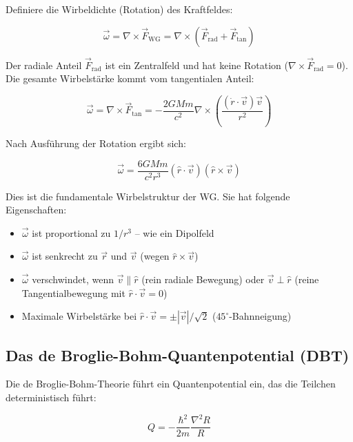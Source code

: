\documentclass[12pt,a4paper]{article}
\begin{document}
Definiere die Wirbeldichte (Rotation) des Kraftfeldes:

\begin{equation}
\vec{\omega} = \nabla \times \vec{F}_{\text{WG}} = \nabla \times (\vec{F}_{\text{rad}} + \vec{F}_{\text{tan}})
\end{equation}

Der radiale Anteil $\vec{F}_{\text{rad}}$ ist ein Zentralfeld und hat keine Rotation ($\nabla \times \vec{F}_{\text{rad}} = 0$). Die gesamte Wirbelstärke kommt vom tangentialen Anteil:

\begin{equation}
\vec{\omega} = \nabla \times \vec{F}_{\text{tan}} = -\frac{2GMm}{c^2} \nabla \times \left( \frac{(\dot{r} \cdot \vec{v}) \vec{v}}{r^2} \right)
\end{equation}

Nach Ausführung der Rotation ergibt sich:

\begin{equation}
\vec{\omega} = \frac{6GMm}{c^2r^3} (\hat{r} \cdot \vec{v})(\hat{r} \times \vec{v})
\end{equation}

Dies ist die fundamentale Wirbelstruktur der WG. Sie hat folgende Eigenschaften:
\begin{itemize}
\item $\vec{\omega}$ ist proportional zu $1/r^3$ -- wie ein Dipolfeld
\item $\vec{\omega}$ ist senkrecht zu $\vec{r}$ und $\vec{v}$ (wegen $\hat{r} \times \vec{v}$)
\item $\vec{\omega}$ verschwindet, wenn $\vec{v} \parallel \hat{r}$ (rein radiale Bewegung) oder $\vec{v} \perp \hat{r}$ (reine Tangentialbewegung mit $\hat{r} \cdot \vec{v} = 0$)
\item Maximale Wirbelstärke bei $\hat{r} \cdot \vec{v} = \pm |\vec{v}|/\sqrt{2}$ ($45^\circ$-Bahnneigung)
\end{itemize}

\subsection{Das de Broglie-Bohm-Quantenpotential (DBT)}

Die de Broglie-Bohm-Theorie führt ein Quantenpotential ein, das die Teilchen deterministisch führt:

\begin{equation}
Q = -\frac{\hbar^2}{2m} \frac{\nabla^2 R}{R}
\end{equation}
\end{document}

